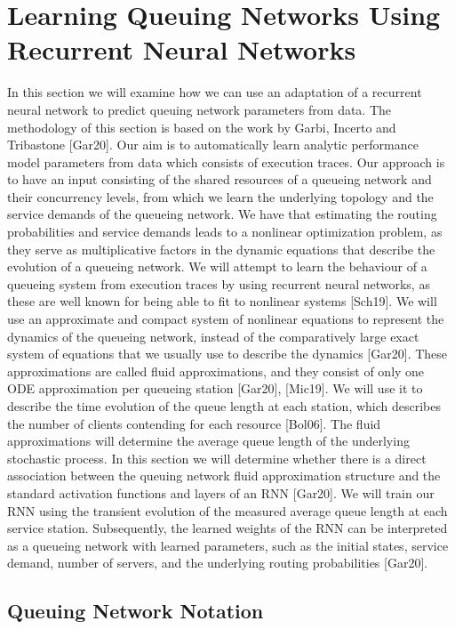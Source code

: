 \documentclass[a4paper,11pt,titlepage]{article}
\begin{document}
\section{Learning Queuing Networks Using Recurrent Neural Networks}

In this section we will examine how we can use an adaptation of a recurrent neural network to predict queuing network parameters from data. The methodology of this section is based on the work by Garbi, Incerto and Tribastone [Gar20]. Our aim is to automatically learn analytic performance model parameters from data which consists of execution traces. Our approach is to have an input consisting of the shared resources of a queueing network and their concurrency levels, from which we learn the underlying topology and the service demands of the queueing network. We have that estimating the routing probabilities and service demands leads to a nonlinear optimization problem, as they serve as multiplicative factors in the dynamic equations that describe the evolution of a queueing network. We will attempt to learn the behaviour of a queueing system from execution traces by using recurrent neural networks, as these are well known for being able to fit to nonlinear systems [Sch19]. We will use an approximate and compact system of nonlinear equations to represent the dynamics of the queueing network, instead of the comparatively large exact system of equations that we usually use to describe the dynamics [Gar20]. These approximations are called fluid approximations, and they consist of only one ODE approximation per queueing station [Gar20], [Mic19]. We will use it to describe the time evolution of the queue length at each station, which describes the number of clients contending for each resource [Bol06]. The fluid approximations will determine the average queue length of the underlying stochastic process. In this section we will determine whether there is a direct association between the queuing network fluid approximation structure and the standard activation functions and layers of an RNN [Gar20]. We will train our RNN using the transient evolution of the measured average queue length at each service station. Subsequently, the learned weights of the RNN can be interpreted as a queueing network with learned parameters, such as the initial states, service demand, number of servers, and the underlying routing probabilities [Gar20]. 

\subsection{Queuing Network Notation}
\end{document}
